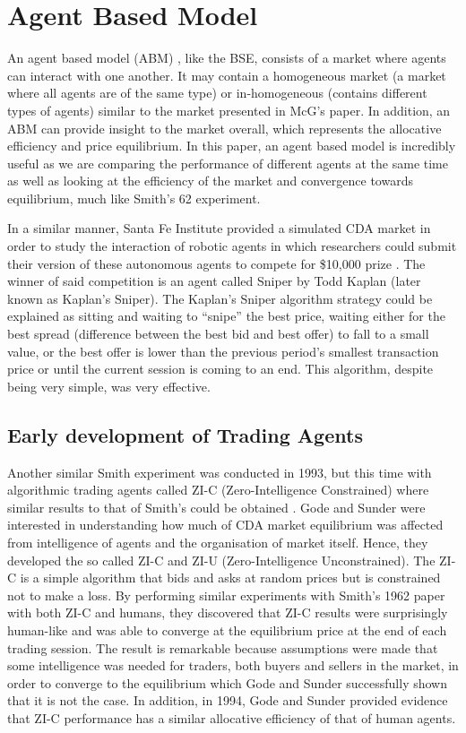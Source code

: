 \section{Agent Based Model}
An agent based model (ABM) , like the BSE, consists of a market where agents can interact with one another. It may contain a homogeneous market (a market where all agents are of the same type) or in-homogeneous (contains different types of agents) similar to the market presented in McG's paper. In addition, an ABM can provide insight to the market overall, which represents the allocative efficiency and price equilibrium. In this paper, an agent based model is incredibly useful as we are comparing the performance of different agents at the same time as well as looking at the efficiency of the market and convergence towards equilibrium, much like Smith’s 62 experiment.

In a similar manner, Santa Fe Institute provided a simulated CDA market in order to study the interaction of robotic agents in which researchers could submit their version of these autonomous agents to compete for \$10,000 prize \cite{Santafe}. The winner of said competition is an agent called Sniper by Todd Kaplan (later known as Kaplan’s Sniper). The Kaplan’s Sniper algorithm strategy could be explained as sitting and waiting to “snipe” the best price, waiting either for the best spread (difference between the best bid and best offer) to fall to a small value, or the best offer is lower than the previous period’s smallest transaction price or until the current session is coming to an end. This algorithm, despite being very simple, was very effective. 

\subsection{Early development of Trading Agents}
Another similar Smith experiment was conducted in 1993, but this time with algorithmic trading agents called ZI-C (Zero-Intelligence Constrained) where similar results to that of Smith’s could be obtained  \cite{godesunder93}. Gode and Sunder were interested in understanding how much of CDA market equilibrium was affected from intelligence of agents and the organisation of market itself. Hence, they developed the so called ZI-C and ZI-U (Zero-Intelligence Unconstrained). The ZI-C is a simple algorithm that bids and asks at random prices but is constrained not to make a loss. By performing similar experiments with Smith’s 1962 \cite{smith1962} paper with both ZI-C and humans, they discovered that ZI-C results were surprisingly human-like and was able to converge at the equilibrium price at the end of each trading session. The result is remarkable because assumptions were made that some intelligence was needed for traders, both buyers and sellers in the market, in order to converge to the equilibrium which Gode and Sunder successfully shown that it is not the case. In addition, in 1994, Gode and Sunder provided evidence that ZI-C performance has a similar allocative efficiency of that of human agents. 

